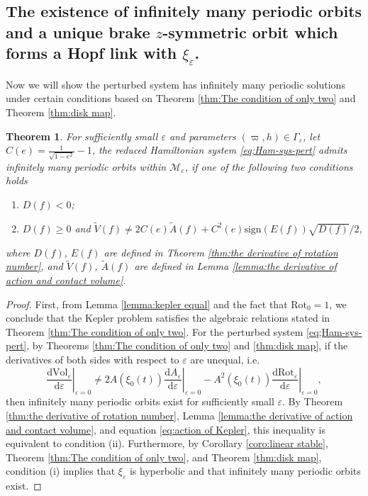 \documentclass[11pt]{amsart}
\newcommand{\M}{\mathcal M}
\newcommand{\ep}{\varepsilon}
\newcommand{\om}{\varpi}
\newtheorem{thm}{Theorem}[section]
\begin{document}
\subsection{The existence of infinitely many periodic orbits and a unique brake $z$-symmetric orbit which forms a Hopf link with $\xi_{\ep}$.}
Now we will show the perturbed system has infinitely many periodic solutions under certain conditions based on Theorem \ref{thm:The condition of only two} and Theorem \ref{thm:disk map}. 

\begin{thm}\label{thm:Exist infinity many}
	For sufficiently small $\ep$ and parameters $(\om,h) \in \Gamma_\ep$, let $C(e)=\frac{1}{\sqrt{1-e^{2}}}-1$, the reduced Hamiltonian system \eqref{eq;Ham-sys-pert} admits infinitely many periodic orbits within $\M_\ep$, if one of the following two conditions holds
	\begin{enumerate}
		\item[(i)] $D(f)<0$;
		\item[(ii)] $D(f)\geq0$ and $\tilde{V}(f)\neq2C(e)\tilde{A}(f)+C^{2}(e)\text{sign}(E(f))\sqrt{D(f)}\slash2$,
	\end{enumerate}
	where $D(f)$, $E(f)$ are defined in Theorem \ref{thm:the derivative of rotation number}, and $\tilde{V}(f)$, $\tilde{A}(f)$ are defined in Lemma \ref{lemma:the derivative of action and contact volume}.
\end{thm}
\begin{proof}
First, from Lemma \ref{lemma:kepler equal} and the fact that $\text{Rot}_0 = 1$, we conclude that the Kepler problem satisfies the algebraic relations stated in Theorem \ref{thm:The condition of only two}. For the perturbed system \eqref{eq;Ham-sys-pert}, by Theorems \ref{thm:The condition of only two} and \ref{thm:disk map}, if the derivatives of both sides with respect to $\ep$ are unequal, i.e. 
$$
\left.\frac{\mathrm{d}\text{Vol}_{\ep}}{\mathrm{d}\ep}\right|_{\ep=0} \neq 2A(\xi_{0}(t))\left.\frac{\mathrm{d}A_{\ep}}{\mathrm{d}\ep}\right|_{\ep=0} - A^2(\xi_{0}(t))\left.\frac{\mathrm{d}\text{Rot}_{\ep}}{\mathrm{d}\ep}\right|_{\ep=0},
$$ 
then infinitely many periodic orbits exist for sufficiently small $\ep$. By Theorem \ref{thm:the derivative of rotation number}, Lemma \ref{lemma:the derivative of action and contact volume}, and equation \eqref{eq:action of Kepler}, this inequality is equivalent to condition (ii). Furthermore, by Corollary \ref{coro:linear stable}, Theorem \ref{thm:The condition of only two}, and Theorem \ref{thm:disk map}, condition (i) implies that $\xi_{\ep}$ is hyperbolic and that infinitely many periodic orbits exist.
\end{proof}
\end{document}
